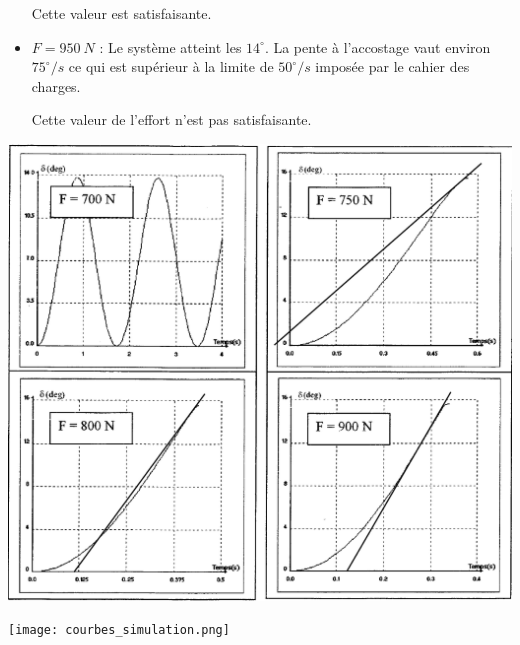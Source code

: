 \begin{multicols}{2}
\begin{corrige}
\begin{itemize}
Cette valeur est satisfaisante.

\item \textbf{$F=\SI{950}{N}$} : Le système atteint les $14^{\circ}$. La pente à l'accostage vaut environ $75^{\circ}/s$ ce
qui est supérieur à la limite de $50^{\circ}/s$ imposée par le cahier des
charges.

Cette valeur de l'effort n'est pas satisfaisante.
\end{itemize}

\begin{center}
\includegraphics[width=1.0\textwidth]{images/courbes_simulation_corrige.png}
\end{center}

\end{corrige}
\else
\fi

\ifprof
\else

\begin{center}
\texttt{[image: courbes\_simulation.png]}
\end{center}
\fi


\end{multicols}
